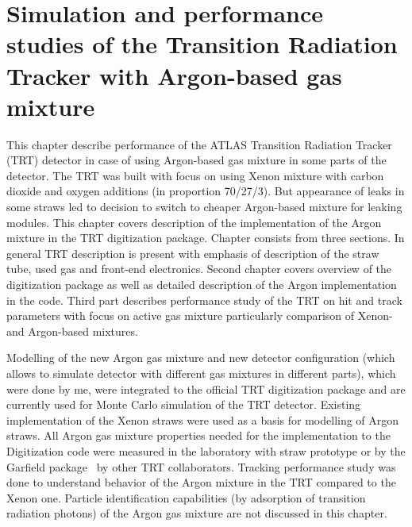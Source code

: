 \chapter{Simulation and performance studies of the Transition Radiation Tracker with Argon-based gas mixture}
\label{chap:TRT}


This chapter describe performance of the ATLAS Transition Radiation Tracker (TRT) detector in case of using 
Argon-based gas mixture in some parts of the detector.
The TRT was built with focus on using Xenon mixture with carbon dioxide and oxygen additions (in proportion 70/27/3).
But appearance of leaks in some straws led to decision to switch to cheaper Argon-based mixture for leaking modules.
This chapter covers description of the implementation of the Argon mixture in the TRT digitization package.
Chapter consists from three sections. In  general TRT description is present with emphasis
of description of the straw tube, used gas and front-end electronics.
Second chapter covers overview of the digitization package as well as detailed description of the Argon implementation in the code.
Third part describes performance study of the TRT on hit and track parameters with focus on active gas mixture particularly comparison of 
Xenon- and Argon-based mixtures.

Modelling of the new Argon gas mixture and new detector configuration (which allows to simulate detector with different gas mixtures in different parts), 
which were done by me, were integrated to the official TRT digitization package and are currently used for Monte Carlo simulation of the TRT detector. 
Existing implementation of the Xenon straws were used as a basis for modelling of Argon straws.
All Argon gas mixture properties needed for the implementation to the Digitization code were measured in the laboratory with straw prototype 
or by the Garfield package~\cite{garfield_program} by other TRT collaborators.
Tracking performance study was done to understand behavior of the Argon mixture in the TRT compared to the Xenon one.
Particle identification capabilities (by adsorption of transition radiation photons) of the Argon gas mixture are not discussed in this chapter.

